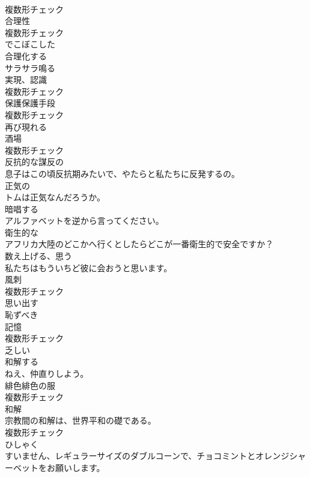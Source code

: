 \documentclass[8pt]{extreport}
\begin{document}
\begin{CJK}{UTF8}{min}
\\	複数形チェック
\\	[名詞]	合理性	
\\	複数形チェック
\\	[形容詞]	でこぼこした	
\\	[動詞]	合理化する	
\\	[動詞]	サラサラ鳴る	
\\	[名詞]	実現、認識	
\\	複数形チェック
\\	[名詞]	保護保護手段	
\\	複数形チェック
\\	[動詞]	再び現れる	
\\	[名詞]	酒場	
\\	複数形チェック
\\	[形容詞]	反抗的な謀反の	
\\	息子はこの頃反抗期みたいで、やたらと私たちに反発するの。	
\\	[形容詞]	正気の	
\\	トムは正気なんだろうか。	
\\	[動詞]	暗唱する	
\\	アルファベットを逆から言ってください。	
\\	[形容詞]	衛生的な	
\\	アフリカ大陸のどこかへ行くとしたらどこが一番衛生的で安全ですか？	
\\	[動詞]	数え上げる、思う	
\\	私たちはもういちど彼に会おうと思います。	
\\	[名詞]	風刺	
\\	複数形チェック
\\	[動詞]	思い出す	
\\	[形容詞]	恥ずべき	
\\	[名詞]	記憶	
\\	複数形チェック
\\	[形容詞]	乏しい	
\\	[動詞]	和解する	
\\	ねえ、仲直りしよう。	
\\	[名詞]	緋色緋色の服	
\\	複数形チェック
\\	[名詞]	和解	
\\	宗教間の和解は、世界平和の礎である。	
\\	複数形チェック
\\	[名詞]	ひしゃく	
\\	すいません、レギュラーサイズのダブルコーンで、チョコミントとオレンジシャーベットをお願いします。	

\end{CJK}
\end{document}
